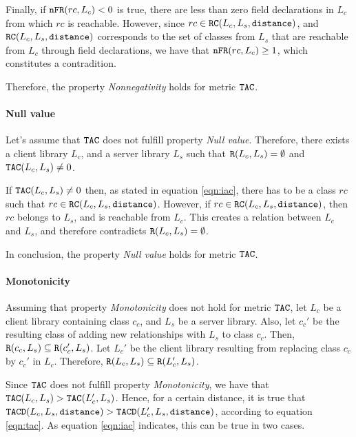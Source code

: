 Finally, if $\verb|nFR|(rc,L_c) < 0$ is true, there are less than zero field declarations in $L_c$ from which $rc$ is reachable. However, since $rc \in \verb|RC|(L_c,L_s,\verb|distance|)$, and $\verb|RC|(L_c,L_s,\verb|distance|)$ corresponds to the set of classes from $L_s$ that are reachable from $L_c$ through field declarations, we have that $\verb|nFR|(rc,L_c) \geq 1$, which constitutes a contradition.

Therefore, the property \textit{Nonnegativity} holds for metric $\verb|TAC|$.

\paragraph{Null value}
Let's assume that $\verb|TAC|$ does not fulfill property \textit{Null value}. Therefore, there exists a client library $L_c$, and a server library $L_s$ such that $\verb|R|(L_c, L_s) = \emptyset$ and $\verb|TAC|(L_c, L_s) \neq 0$.

If $\verb|TAC|(L_c, L_s) \neq 0$ then, as stated in equation \ref{eqn:iac}, there has to be a class $rc$ such that  $rc \in \verb|RC|(L_c,L_s,\verb|distance|)$. However, if $rc \in \verb|RC|(L_c,L_s,\verb|distance|)$, then $rc$ belongs to $L_s$, and is reachable from $L_c$. This creates a relation between $L_c$ and $L_s$, and therefore contradicts $\verb|R|(L_c, L_s) = \emptyset$.

In conclusion, the property \textit{Null value} holds for metric $\verb|TAC|$.

\paragraph{Monotonicity}
Assuming that property \textit{Monotonicity} does not hold for metric $\verb|TAC|$, let $L_c$ be a client library containing class $c_c$, and $L_s$ be a server library. Also, let $c_c'$ be the resulting class of adding new relationships with $L_s$ to class $c_c$. Then, $\verb|R|(c_c, L_s) \subseteq \verb|R|(c_c', L_s)$. Let $L_c'$ be the client library resulting from replacing class $c_c$ by $c_c'$ in $L_c$. Therefore, $\verb|R|(L_c, L_s) \subseteq \verb|R|(L_c', L_s)$.

Since $\verb|TAC|$ does not fulfill property \textit{Monotonicity}, we have that $\verb|TAC|(L_c, L_s) > \verb|TAC|(L_c', L_s)$. Hence, for a certain distance, it is true that $\verb|TACD|(L_c,L_s,\verb|distance|) > \verb|TACD|(L_c',L_s,\verb|distance|)$, according to equation \ref{eqn:tac}. As equation \ref{eqn:iac} indicates, this can be true in two cases.

